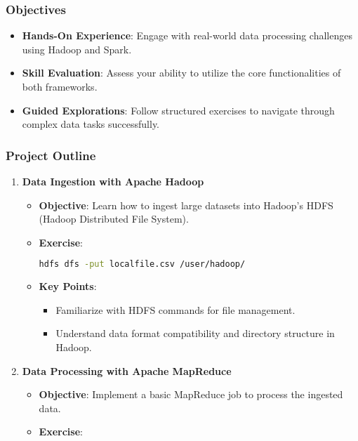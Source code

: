 \documentclass[aspectratio=169]{beamer}
\begin{document}
\begin{frame}[fragile]
    \frametitle{Objectives}
    \begin{itemize}
        \item \textbf{Hands-On Experience}: Engage with real-world data processing challenges using Hadoop and Spark.
        \item \textbf{Skill Evaluation}: Assess your ability to utilize the core functionalities of both frameworks.
        \item \textbf{Guided Explorations}: Follow structured exercises to navigate through complex data tasks successfully.
    \end{itemize}
\end{frame}

\begin{frame}[fragile]
    \frametitle{Project Outline}
    \begin{enumerate}
        \item \textbf{Data Ingestion with Apache Hadoop}
            \begin{itemize}
                \item \textbf{Objective}: Learn how to ingest large datasets into Hadoop's HDFS (Hadoop Distributed File System).
                \item \textbf{Exercise}:
                    \begin{lstlisting}[language=bash]
hdfs dfs -put localfile.csv /user/hadoop/
                    \end{lstlisting}
                \item \textbf{Key Points}:
                    \begin{itemize}
                        \item Familiarize with HDFS commands for file management.
                        \item Understand data format compatibility and directory structure in Hadoop.
                    \end{itemize}
            \end{itemize}
        \item \textbf{Data Processing with Apache MapReduce}
            \begin{itemize}
                \item \textbf{Objective}: Implement a basic MapReduce job to process the ingested data.
                \item \textbf{Exercise}:
                    \begin{lstlisting}[language=bash]

\end{lstlisting}
\end{itemize}
\end{enumerate}
\end{frame}
\end{document}
